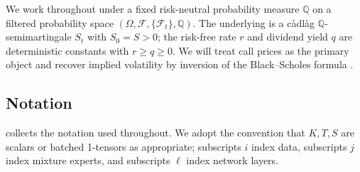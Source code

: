 \documentclass[largeformat]{interact}
\let\cite\citep   %
\theoremstyle{plain}
\theoremstyle{definition}
\newcommand{\Qm}{\mathbb{Q}}
\newcommand{\bs}{Black--Scholes}
\begin{document}
We work throughout under a fixed risk-neutral probability measure $\Qm$ on a filtered probability space $(\Omega, \mathcal{F}, \{\mathcal{F}_t\}, \Qm)$. The underlying is a c\`adl\`ag $\Qm$-semimartingale $S_t$ with $S_0 = S > 0$; the risk-free rate $r$ and dividend yield $q$ are deterministic constants with $r \geq q \geq 0$. We will treat call prices as the primary object and recover implied volatility by inversion of the \bs{} formula \cite{black1973pricing}.

\subsection{Notation}

 collects the notation used throughout. We adopt the convention that $K, T, S$ are scalars or batched 1-tensors as appropriate; subscripts $i$ index data, subscripts $j$ index mixture experts, and subscripts $\ell$ index network layers.
\end{document}
